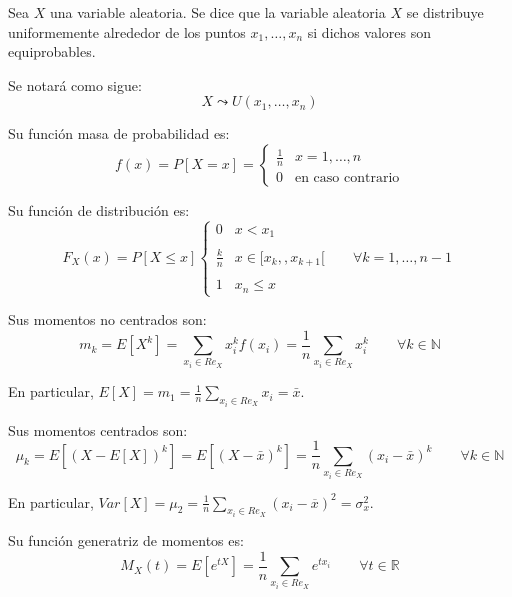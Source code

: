 \begin{definicion}
    Sea $X$ una variable aleatoria. Se dice que la variable aleatoria $X$ se distribuye uniformemente alrededor de los puntos $x_1,\dots, x_n$ si dichos valores son equiprobables.

    Se notará como sigue:
    \begin{equation*}
        X \leadsto U(x_1,\dots, x_n)
    \end{equation*}
\end{definicion}

Su función masa de probabilidad es:
\begin{equation*}
    f(x) = P[X=x] = \left\{\begin{array}{cc}
        \frac{1}{n} & x=1,\dots, n \\
        0 & \text{en caso contrario}
    \end{array}\right.
\end{equation*}

Su función de distribución es:
\begin{equation*}
    F_X(x) = P[X\leq x] \left\{\begin{array}{cl}
        0 & x<x_1 \\ \\
        \frac{k}{n} & x\in [x_k,, x_{k+1}[ \qquad \forall k=1,\dots, n-1\\ \\
        1 & x_n\leq x
    \end{array}\right.
\end{equation*}

Sus momentos no centrados son:
\begin{equation*}
    m_k = E[X^k]
    = \sum_{x_i\in Re_X}x_i^kf(x_i)
    = \frac{1}{n} \sum_{x_i\in Re_X}x_i^k
    \qquad \forall k\in \mathbb{N}
\end{equation*}

En particular, $\displaystyle E[X]=m_1 = \frac{1}{n} \sum_{x_i\in Re_X}x_i = \bar{x}$.

Sus momentos centrados son:
\begin{equation*}
    \mu_k = E[(X-E[X])^k]
    = E[(X-\bar{x})^k]
    = \frac{1}{n} \sum_{x_i\in Re_X}(x_i-\bar{x})^k   
    \qquad \forall k\in \mathbb{N}
\end{equation*}

En particular, $\displaystyle Var[X]=\mu_2 = \frac{1}{n} \sum_{x_i\in Re_X}(x_i-\overline{x})^2 = \sigma_{x}^2$.

Su función generatriz de momentos es:
\begin{equation*}
    M_X(t) = E[e^{tX}] = \frac{1}{n} \sum_{x_i\in Re_X}e^{tx_i}     
    \qquad \forall t\in \mathbb{R}
\end{equation*}

